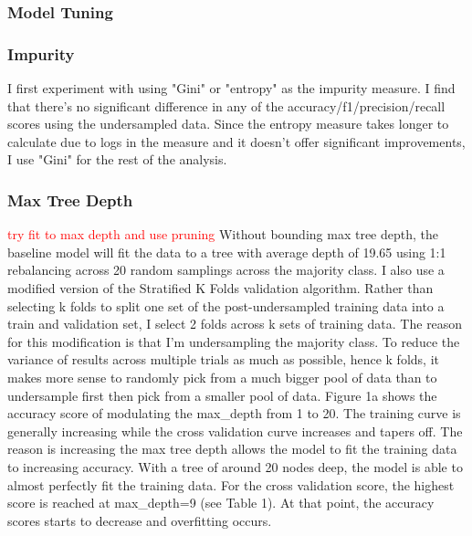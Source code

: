 \documentclass{article}
\newcommand\todo[1]{\textcolor{red}{#1}}
\begin{document}
\subsubsection*{Model Tuning}
\subsubsection*{Impurity}
I first experiment with using "Gini" or "entropy" as the impurity measure. I find that there's no significant difference in any of the accuracy/f1/precision/recall scores using the undersampled data. Since the entropy measure takes longer to calculate due to logs in the measure and it doesn't offer significant improvements, I use "Gini" for the rest of the analysis.


\subsubsection*{Max Tree Depth}
\todo{ try fit to max depth and use pruning}
Without bounding max tree depth, the baseline model will fit the data to a tree with average depth of 19.65 using 1:1 rebalancing across 20 random samplings across the majority class. I also use a modified version of the Stratified K Folds validation algorithm. Rather than selecting k folds to split one set of the post-undersampled training data into a train and validation set, I select 2 folds across k sets of training data. The reason for this modification is that I'm undersampling the majority class. To reduce the variance of results across multiple trials as much as possible, hence k folds, it makes more sense to randomly pick from a much bigger pool of data than to undersample first then pick from a smaller pool of data. 
Figure 1a shows the accuracy score of modulating the max\_depth from 1 to 20. The training curve is generally increasing while the cross validation curve increases and tapers off. The reason is increasing the max tree depth allows the model to fit the training data to increasing accuracy. With a tree of around 20 nodes deep, the model is able to almost perfectly fit the training data. For the cross validation score, the highest score is reached at max\_depth=9 (see Table 1). At that point, the accuracy scores starts to decrease and overfitting occurs. 
\end{document}
